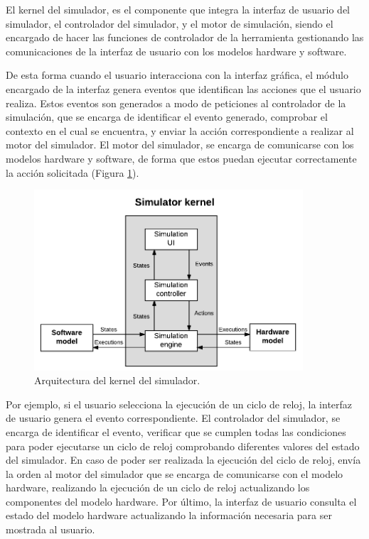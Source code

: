 El kernel del simulador, es el componente que integra la interfaz de usuario del simulador, el controlador del simulador, y el motor de simulación, siendo el encargado de hacer las funciones de controlador de la herramienta gestionando las comunicaciones de la interfaz de usuario con los modelos \gls{hardware} y \gls{software}. 

De esta forma cuando el usuario interacciona con la interfaz gráfica, el módulo encargado de la interfaz genera eventos que identifican las acciones que el usuario realiza. Estos eventos son generados a modo de peticiones al controlador de la simulación, que se encarga de identificar el evento generado, comprobar el contexto en el cual se encuentra, y enviar la acción correspondiente a realizar al motor del simulador. El motor del simulador, se encarga de comunicarse con los modelos \gls{hardware} y \gls{software}, de forma que estos puedan ejecutar correctamente la acción solicitada (Figura \ref{fig:kernel_diagram}).

\begin{figure}[htbp]
 	\centering
 	\includegraphics[width=10cm]{figures/kernel_diagram}
 	\caption{Arquitectura del kernel del simulador.}
	\label{fig:kernel_diagram}
\end{figure}

Por ejemplo, si el usuario selecciona la ejecución de un ciclo de reloj, la interfaz de usuario genera el evento correspondiente. El controlador del simulador, se encarga de identificar el evento, verificar que se cumplen todas las condiciones para poder ejecutarse un ciclo de reloj comprobando diferentes valores del estado del simulador. En caso de poder ser realizada la ejecución del ciclo de reloj, envía la orden al motor del simulador que se encarga de comunicarse con el  modelo \gls{hardware}, realizando la ejecución de un ciclo de reloj actualizando los componentes del modelo \gls{hardware}. Por último, la interfaz de usuario consulta el estado del modelo \gls{hardware} actualizando la información necesaria para ser mostrada al usuario.




